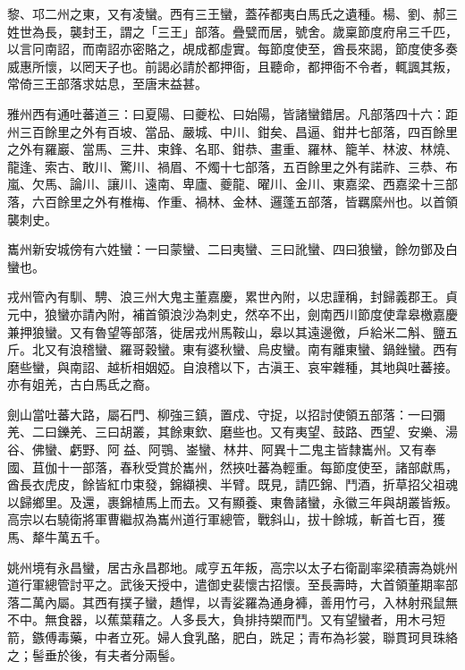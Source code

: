 \begin{pinyinscope}
 黎、邛二州之東，又有凌蠻。西有三王蠻，蓋莋都夷白馬氏之遺種。楊、劉、郝三姓世為長，襲封王，謂之「三王」部落。疊甓而居，號舍。歲稟節度府帛三千匹，以言冋南詔，而南詔亦密賂之，覘成都虛實。每節度使至，酋長來謁，節度使多奏威惠所懷，以罔天子也。前謁必請於都押衙，且聽命，都押衙不令者，輒諷其叛，常倚三王部落求姑息，至唐末益甚。



 雅州西有通吐蕃道三：曰夏陽、曰夔松、曰始陽，皆諸蠻錯居。凡部落四十六：距州三百餘里之外有百坡、當品、嚴城、中川、鉗矣、昌逼、鉗井七部落，四百餘里之外有羅巖、當馬、三井、束鋒、名耶、鉗恭、畫重、羅林、籠羊、林波、林燒、龍逢、索古、敢川、驚川、禍眉、不燭十七部落，五百餘里之外有諾祚、三恭、布嵐、欠馬、論川、讓川、遠南、卑廬、夔龍、曜川、金川、東嘉梁、西嘉梁十三部落，六百餘里之外有椎梅、作重、禍林、金林、邏蓬五部落，皆羈縻州也。以首領襲刺史。



 巂州新安城傍有六姓蠻：一曰蒙蠻、二曰夷蠻、三曰訛蠻、四曰狼蠻，餘勿鄧及白蠻也。



 戎州管內有馴、騁、浪三州大鬼主董嘉慶，累世內附，以忠謹稱，封歸義郡王。貞元中，狼蠻亦請內附，補首領浪沙為刺史，然卒不出，劍南西川節度使韋皋檄嘉慶兼押狼蠻。又有魯望等部落，徙居戎州馬鞍山，皋以其遠邊徼，戶給米二斛、鹽五斤。北又有浪稽蠻、羅哥穀蠻。東有婆秋蠻、烏皮蠻。南有離東蠻、鍋銼蠻。西有磨些蠻，與南詔、越析相姻婭。自浪稽以下，古滇王、哀牢雜種，其地與吐蕃接。亦有姐羌，古白馬氐之裔。



 劍山當吐蕃大路，屬石門、柳強三鎮，置戍、守捉，以招討使領五部落：一曰彌羌、二曰鑠羌、三曰胡叢，其餘東欽、磨些也。又有夷望、鼓路、西望、安樂、湯谷、佛蠻、虧野、阿益、阿鶚、崟蠻、林井、阿異十二鬼主皆隸巂州。又有奉國、苴伽十一部落，春秋受賞於巂州，然挾吐蕃為輕重。每節度使至，諸部獻馬，酋長衣虎皮，餘皆紅巾束發，錦纈襖、半臂。既見，請匹錦、鬥酒，折草招父祖魂以歸鄉里。及還，裹錦植馬上而去。又有顯養、東魯諸蠻，永徽三年與胡叢皆叛。高宗以右驍衛將軍曹繼叔為巂州道行軍總管，戰斜山，拔十餘城，斬首七百，獲馬、犛牛萬五千。



 姚州境有永昌蠻，居古永昌郡地。咸亨五年叛，高宗以太子右衛副率梁積壽為姚州道行軍總管討平之。武後天授中，遣御史裴懷古招懷。至長壽時，大首領董期率部落二萬內屬。其西有撲子蠻，趫悍，以青娑羅為通身褲，善用竹弓，入林射飛鼠無不中。無食器，以蕉葉藉之。人多長大，負排持槊而鬥。又有望蠻者，用木弓短箭，鏃傅毒藥，中者立死。婦人食乳酪，肥白，跣足；青布為衫裳，聯貫珂貝珠絡之；髻垂於後，有夫者分兩髻。




\end{pinyinscope}
